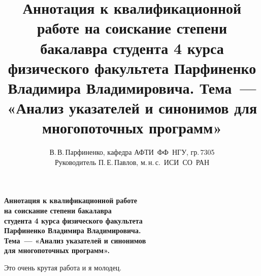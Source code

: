 \documentclass[12pt]{article}
\title{
  Аннотация к квалификационной работе на соискание степени бакалавра студента 4
  курса физического факультета Парфиненко Владимира Владимировича.
  Тема~--- «Анализ указателей и синонимов для многопоточных программ»
}
\author{
  В.\,В.\,Парфиненко, кафедра АФТИ~ФФ~НГУ, гр.\,7305\\
  Руководитель П.\,Е.\,Павлов, м.\,н.\,с.~ИСИ~СО~РАН
}
\begin{document}
  \thispagestyle{empty}

  \begin{center}
    \bfseries
    Аннотация к квалификационной работе\\
    на соискание степени бакалавра\\
    студента 4 курса физического факультета\\
    Парфиненко Владимира Владимировича.\\
    Тема~--- «Анализ указателей и синонимов\\
    для многопоточных программ».
  \end{center}
  \vspace{0.5cm}

  Это очень крутая работа и я молодец.
\end{document}
